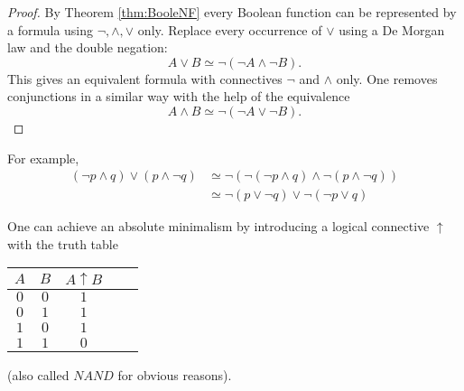 

\setcounter{section}{1}
\setcounter{subsection}{4}
\setcounter{dfn}{14}

\begin{proof}
By Theorem \ref{thm:BooleNF} every Boolean function can be represented by a formula using $\neg, \wedge, \vee$ only.
Replace every occurrence of $\vee$ using a De Morgan law and the double negation:
\[
A \vee B \simeq \neg(\neg A \wedge \neg B).
\]
This gives an equivalent formula with connectives $\neg$ and $\wedge$ only.
One removes conjunctions in a similar way with the help of the equivalence
\[
A \wedge B \simeq \neg (\neg A \vee \neg B).
\]
\end{proof}

For example,
\begin{align*}
(\neg p \wedge q) \vee (p \wedge \neg q) &\simeq \neg(\neg(\neg p \wedge q) \wedge \neg (p \wedge \neg q))\\
&\simeq \neg(p \vee \neg q) \vee \neg(\neg p \vee q)
\end{align*}

One can achieve an absolute minimalism by introducing a logical connective $\uparrow$ with the truth table
\begin{center}
\begin{tabular}{|c|c||c|c|c|}
\hline
$A$ & $B$ & $A \uparrow B$\\\hline
$0$ & $0$ & $1$\\\hline
$0$ & $1$ & $1$\\\hline
$1$ & $0$ & $1$\\\hline
$1$ & $1$ & $0$\\\hline
\end{tabular}
\end{center}
(also called $NAND$ for obvious reasons).



